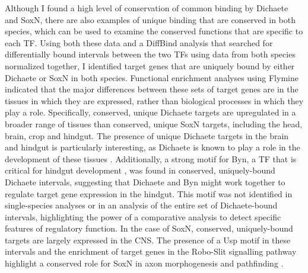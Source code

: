 Although I found a high level of conservation of common binding by Dichaete and SoxN, there are also examples of unique binding that are conserved in both species, which can be used to examine the conserved functions that are specific to each TF. Using both these data and a DiffBind analysis that searched for differentially bound intervals between the two TFs using data from both species normalized together, I identified target genes that are uniquely bound by either Dichaete or SoxN in both species. Functional enrichment analyses using Flymine indicated that the major differences between these sets of target genes are in the tissues in which they are expressed, rather than biological processes in which they play a role. Specifically, conserved, unique Dichaete targets are upregulated in a broader range of tissues than conserved, unique SoxN targets, including the head, brain, crop and hindgut. The presence of unique Dichaete targets in the brain and hindgut is particularly interesting, as Dichaete is known to play a role in the development of these tissues \citep{sanchez-soriano_regulatory_2000}. Additionally, a strong motif for Byn, a TF that is critical for hindgut development \citep{kispert_homologs_1994,murakami_developmental_1999}, was found in conserved, uniquely-bound Dichaete intervals, suggesting that Dichaete and Byn might work together to regulate target gene expression in the hindgut. This motif was not identified in single-species analyses or in an analysis of the entire set of Dichaete-bound intervals, highlighting the power of a comparative analysis to detect specific features of regulatory function. In the case of SoxN, conserved, uniquely-bound targets are largely expressed in the CNS. The presence of a Usp motif in these intervals and the enrichment of target genes in the Robo-Slit signalling pathway highlight a conserved role for SoxN in axon morphogenesis and pathfinding \citep{ferrero_soxneuro_2014,girard_chromatin_2006,lee_cell-autonomous_????,parrish_genome-wide_2006}.\\

